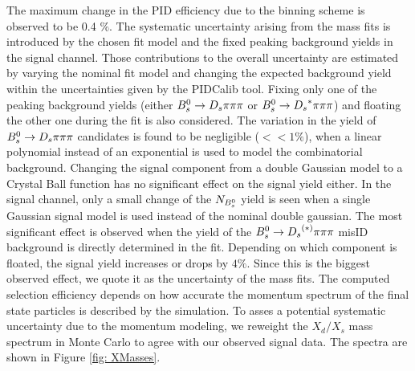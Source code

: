 The maximum change in the PID efficiency due to the binning scheme is observed to be 0.4 $\%$. \newline
The systematic uncertainty arising from the mass fits is introduced by the chosen fit model and the fixed peaking background yields in the signal channel. 
Those contributions to the overall uncertainty are estimated by varying the nominal fit model and changing the expected background yield within the uncertainties given by the PIDCalib tool. 
Fixing only one of the peaking background yields (either ${{B}^0_{s}}\rightarrow{\ensuremath{{D}_{s}}}{\ensuremath{\pi}}{\ensuremath{\pi}}{\ensuremath{\pi}}$ or ${{B}^0_{s}}\rightarrow{\ensuremath{{D}_{s}}}^{*}{\pi}{\pi}{\pi}$) and floating the other one during the fit is also considered.
The variation in the yield of ${{B}^0_{s}}\rightarrow{\ensuremath{{D}_{s}}}{\ensuremath{\pi}}{\ensuremath{\pi}}{\ensuremath{\pi}}$ candidates is found to be negligible ($<< 1 \%$), when a linear polynomial instead of an exponential is used to model the combinatorial background. 
Changing the signal component from a double Gaussian model to a Crystal Ball function has no significant effect on the signal yield either. 
In the signal channel, only a small change of the $N_{{{B}^0_{s}}}$ yield is seen when a single Gaussian signal model is used instead of the nominal double gaussian. 
The most significant effect is observed when the yield of the ${{B}^0_{s}}\rightarrow{\ensuremath{{D}_{s}}}^{(*)}{\pi}{\pi}{\pi}$ misID background is directly determined in the fit. 
Depending on which component is floated, the signal yield increases or drops by $4 \%$. Since this is the biggest observed effect, we quote it as the uncertainty of the mass fits. \newline
The computed selection efficiency depends on how accurate the momentum spectrum of the final state particles is described by the simulation. 
To asses a potential systematic uncertainty due to the momentum modeling, we reweight the $X_{d}/X_{s}$ mass spectrum in Monte Carlo to agree with our observed signal data. The spectra are shown in Figure \ref{fig: XMasses}.

